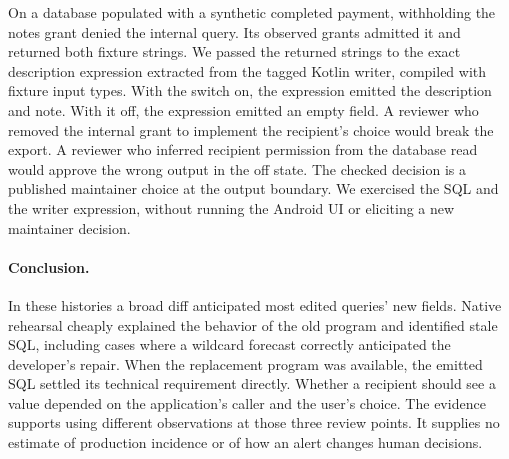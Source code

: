 \documentclass[11pt,a4paper]{article}
\begin{document}
On a database populated with a synthetic completed payment, withholding the notes grant denied the internal query. Its observed grants admitted it and returned both fixture strings. We passed the returned strings to the exact description expression extracted from the tagged Kotlin writer, compiled with fixture input types. With the switch on, the expression emitted the description and note. With it off, the expression emitted an empty field. A reviewer who removed the internal grant to implement the recipient's choice would break the export. A reviewer who inferred recipient permission from the database read would approve the wrong output in the off state. The checked decision is a published maintainer choice at the output boundary. We exercised the SQL and the writer expression, without running the Android UI or eliciting a new maintainer decision.

\paragraph{Conclusion.} In these histories a broad diff anticipated most edited queries' new fields. Native rehearsal cheaply explained the behavior of the old program and identified stale SQL, including cases where a wildcard forecast correctly anticipated the developer's repair. When the replacement program was available, the emitted SQL settled its technical requirement directly. Whether a recipient should see a value depended on the application's caller and the user's choice. The evidence supports using different observations at those three review points. It supplies no estimate of production incidence or of how an alert changes human decisions.
\end{document}
